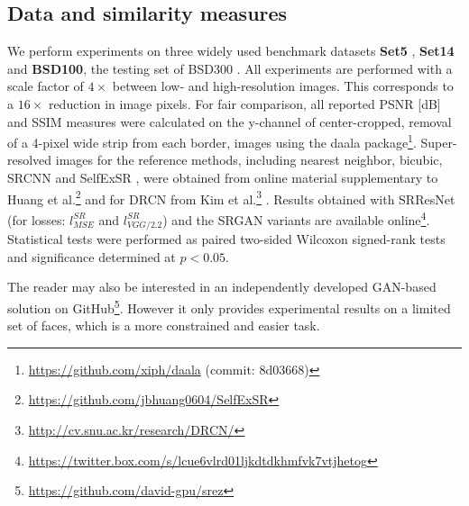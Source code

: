\documentclass[10pt,twocolumn,letterpaper]{article}
\begin{document}
\subsection{Data and similarity measures}
\label{subsec:data}
We perform experiments on three widely used benchmark datasets \textbf{Set5} \cite{bevilacqua2012low}, \textbf{Set14} \cite{zeyde2012single} and \textbf{BSD100}, the testing set of BSD300 \cite{MartinFTM01}. All experiments are performed with a scale factor of $4\times$ between low- and high-resolution images. This corresponds to a $16\times$ reduction in image pixels. For fair  comparison, all reported \ac{PSNR} [dB] and \ac{SSIM} \cite{Wang2004} measures were calculated on the y-channel of center-cropped, removal of a 4-pixel wide strip from each border, images using the daala package\footnote{\url{https://github.com/xiph/daala} (commit: 8d03668)}. Super-resolved images for the reference methods, including nearest neighbor, bicubic, SRCNN \cite{dong2014learning} and SelfExSR \cite{Huang15selfexemplars}, were obtained from online material supplementary to Huang et al.\footnote{\url{https://github.com/jbhuang0604/SelfExSR}} \cite{Huang15selfexemplars} and for DRCN from Kim et al.\footnote{\url{http://cv.snu.ac.kr/research/DRCN/}} \cite{kim2016deeply}.	
	Results obtained with SRResNet (for losses: $l^{SR}_{MSE}$ and $l^{SR}_{VGG/2.2}$) and the SRGAN variants are available online\footnote{\url{https://twitter.box.com/s/lcue6vlrd01ljkdtdkhmfvk7vtjhetog}}.
	Statistical tests were performed as paired two-sided Wilcoxon signed-rank tests and significance determined at $p<0.05$.
	
	The reader may also be interested in an independently developed GAN-based solution on GitHub\footnote{\url{https://github.com/david-gpu/srez}}. However it only provides experimental results on a limited set of faces, which is a more constrained and easier task.
\end{document}

